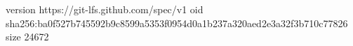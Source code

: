 version https://git-lfs.github.com/spec/v1
oid sha256:ba0f527b745592b9c8599a5353f0954d0a1b237a320aed2e3a32f3b710c77826
size 24672
